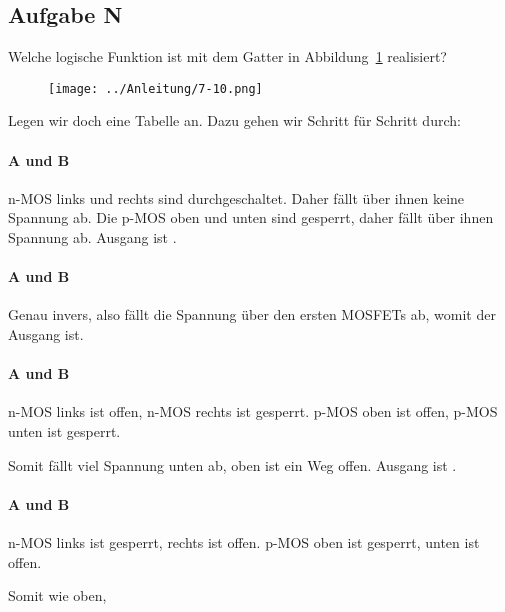 \FloatBarrier
\subsection{Aufgabe N}

\begin{problem}
	Welche logische Funktion ist mit dem Gatter in Abbildung~\ref{fig:7-10}
	realisiert?
\end{problem}

\begin{figure}[htbp]
	\centering
	\texttt{[image: ../Anleitung/7-10.png]}
	\caption{%
		\cite[Abbildung~7.10]{physik313-Anleitung}
	}
	\label{fig:7-10}
\end{figure}

Legen wir doch eine Tabelle an. Dazu gehen wir Schritt für Schritt durch:

\paragraph{A und B \tlow}

n-MOS links und rechts sind durchgeschaltet. Daher fällt über ihnen keine
Spannung ab. Die p-MOS oben und unten sind gesperrt, daher fällt über ihnen
Spannung ab. Ausgang ist \thigh.

\paragraph{A und B \thigh}

Genau invers, also fällt die Spannung über den ersten MOSFETs ab, womit der
Ausgang \tlow ist.

\paragraph{A \thigh{} und B \tlow}

n-MOS links ist offen, n-MOS rechts ist gesperrt. p-MOS oben ist offen, p-MOS
unten ist gesperrt.

Somit fällt viel Spannung unten ab, oben ist ein Weg offen. Ausgang ist \thigh.

\paragraph{A \tlow{} und B \thigh}

n-MOS links ist gesperrt, rechts ist offen. p-MOS oben ist gesperrt, unten ist
offen.

Somit wie oben, \thigh

